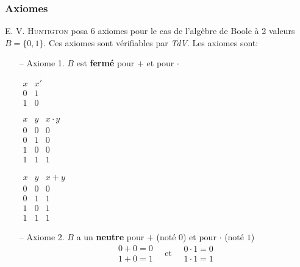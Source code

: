 \subsubsection{Axiomes}
E. V. \textsc{Huntigton} posa 6 axiomes pour le cas de l'algèbre de Boole à 2 valeurs $B=\{0,1\}$. Ces axiomes sont vérifiables par \textit{TdV}. Les axiomes sont:
\begin{itemize}
	\item[-- Axiome 1.] $B$ est \textbf{fermé} pour $+$ et pour $\cdot$
	\begin{table}[H]
		\begin{minipage}{0.3\textwidth}
			\centering
			$\begin{array}{c|c}
				x & x'\\
				\hline
				0 & 1\\
				1 & 0
			\end{array}$
		\end{minipage}
		\begin{minipage}{0.3\textwidth}
			\centering
			$\begin{array}{c|c|c}
				x & y &x\cdot y\\
				\hline
				0 & 0 & 0\\
				0 & 1 & 0\\
				1 & 0 & 0\\
				1 & 1 & 1
			\end{array}$
		\end{minipage}
		\begin{minipage}{0.3\textwidth}
			\centering
			$\begin{array}{c|c|c}
				x & y &x+ y\\
				\hline
				0 & 0 & 0\\
				0 & 1 & 1\\
				1 & 0 & 1\\
				1 & 1 & 1
			\end{array}$
		\end{minipage}
	\end{table}
	\item[-- Axiome 2.] $B$ a un \textbf{neutre} pour $+$ (noté $0$) et pour $\cdot$ (noté $1$)
	\begin{equation}
		\begin{array}{l}
			0+0=0\\
			1+0=1
		\end{array}
		\quad\text{et}\quad 
		\begin{array}{c}
			0\cdot 1=0\\
			1\cdot 1=1
		\end{array}

\end{equation}
\end{itemize}
